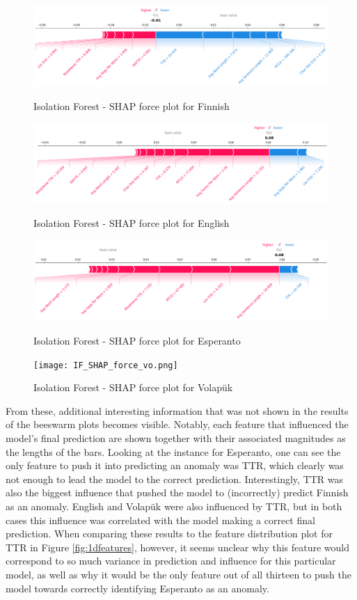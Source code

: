 \documentclass[12pt,a4paper]{article}
\numberwithin{figure}{section}
\numberwithin{table}{section}
\numberwithin{definition}{section}
\begin{document}
\begin{figure}[!ht]
  \centering
  \includegraphics[width=\textwidth]{IF_SHAP_force_fi.png} 
  \caption{Isolation Forest - SHAP force plot for Finnish}
  \includegraphics[width=\textwidth]{IF_SHAP_force_en.png}
  \caption{Isolation Forest - SHAP force plot for English}
  \includegraphics[width=\textwidth]{IF_SHAP_force_eo.png}
  \caption{Isolation Forest - SHAP force plot for Esperanto}
  \texttt{[image: IF\_SHAP\_force\_vo.png]}
  \caption{Isolation Forest - SHAP force plot for Volapük}
  \label{fig:shapforceplots}
\end{figure}

From these, additional interesting information that was not shown in the results of the beeswarm plots becomes visible. Notably, each feature that influenced the model's final prediction are shown together with their associated magnitudes as the lengths of the bars. Looking at the instance for Esperanto, one can see the only feature to push it into predicting an anomaly was TTR, which clearly was not enough to lead the model to the correct prediction. Interestingly, TTR was also the biggest influence that pushed the model to (incorrectly) predict Finnish as an anomaly. English and Volapük were also influenced by TTR, but in both cases this influence was correlated with the model making a correct final prediction. When comparing these results to the feature distribution plot for TTR in Figure \ref{fig:1dfeatures}, however, it seems unclear why this feature would correspond to so much variance in prediction and influence for this particular model, as well as why it would be the only feature out of all thirteen to push the model towards correctly identifying Esperanto as an anomaly.  
\end{document}
